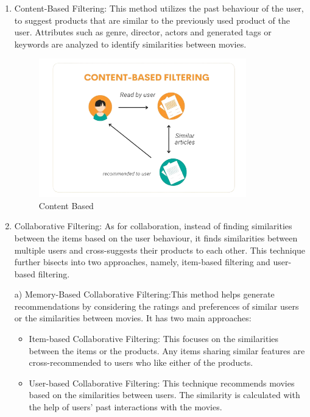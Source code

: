 \documentclass[a4paper,10pt]{article}
\begin{document}
\begin{enumerate}
    \item Content-Based Filtering: This method utilizes the past behaviour of the user, to suggest products that are similar to the previously used product of the user. Attributes such as genre, director, actors and generated tags or keywords are analyzed to identify similarities between movies.
    
\begin{figure}[H]
\centering
\includegraphics[height=6cm]{figures/content.png}
\caption{Content Based}
\label{content}
\end{figure}

    \item  Collaborative Filtering: As for collaboration, instead of finding similarities between the items based on the user behaviour, it finds similarities between multiple users and cross-suggests their products to each other. This technique further bisects into two approaches, namely, item-based filtering and user-based filtering.

          a)  Memory-Based Collaborative Filtering:This method helps generate recommendations by considering the ratings and preferences of similar users or the similarities between movies. It has two main approaches:
\vspace{2pt}
  
    \begin{itemize}
        \item Item-based Collaborative Filtering: This focuses on the similarities between the items or the products. Any items sharing similar features are cross-recommended to users who like either of the products.
    \end{itemize}

    \begin{itemize}
        \item User-based Collaborative Filtering: This technique recommends movies based on the similarities between users. The similarity is calculated with the help of users’ past interactions with the movies.
    \end{itemize}


\end{enumerate}
\end{document}
